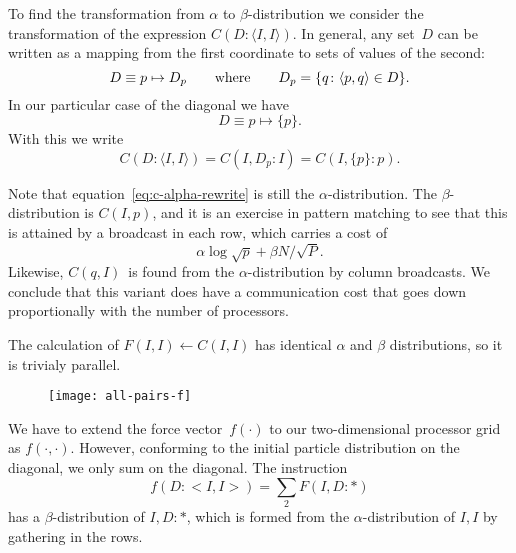 To find the transformation from $\alpha$ to $\beta$-distribution
we consider the
transformation of the expression $C(D\colon\langle I,I\rangle)$.
In general, any set~$D$ can be written as a mapping from the first coordinate to
sets of values of the second:
\[ D\equiv p\mapsto D_p\qquad\hbox{where}\qquad
  D_p=\{q\colon \langle p,q\rangle\in D\}.
\]
In our particular case of the diagonal we have
\[ D\equiv p\mapsto\{p\}.\]
With this we write
\begin{equation}
C(D\colon \langle I,I\rangle) = C(I,D_p\colon I) = C(I,\{p\}\colon p).
\label{eq:c-alpha-rewrite}
\end{equation}

Note that equation~\eqref{eq:c-alpha-rewrite} is still the $\alpha$-distribution.
The $\beta$-distribution is $C(I,p)$, and it is an exercise in pattern matching to 
see that this is attained by a broadcast in each row, which carries a cost of
\[ \alpha \log\sqrt p + \beta N/\sqrt P. \]
Likewise, $C(q,I)$~is found from the $\alpha$-distribution by 
column broadcasts. We conclude that this variant does
have a communication cost that goes down proportionally
with the number of processors.


The calculation of $F(I,I)\leftarrow C(I,I)$ has identical $\alpha$ and $\beta$ 
distributions, so it is trivialy parallel.


\begin{wrapfigure}{r}{2in}
  \texttt{[image: all-pairs-f]}
\end{wrapfigure}
%
We have to extend the force vector~$f(\cdot)$ to our two-dimensional
processor grid as $f(\cdot,\cdot)$. However, conforming to the initial 
particle distribution on the diagonal, we only sum on the diagonal.
The instruction
\[ f(D\colon<I,I>)=\sum_2 F(I,D\colon *) \]
has a $\beta$-distribution of $I,D:*$, which is formed from the $\alpha$-distribution
of $I,I$ by gathering in the rows.

